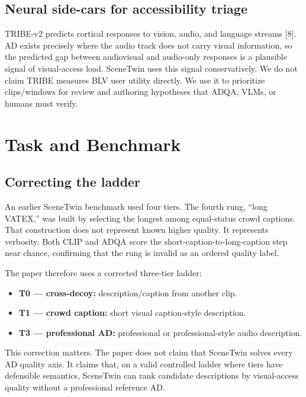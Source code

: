 \documentclass[10pt,twocolumn]{article}
\begin{document}
\subsection{Neural side-cars for accessibility triage}

TRIBE-v2 predicts cortical responses to vision, audio, and language streams [8]. AD exists precisely where the audio track does not carry visual information, so the predicted gap between audiovisual and audio-only responses is a plausible signal of visual-access load. SceneTwin uses this signal conservatively. We do not claim TRIBE measures BLV user utility directly. We use it to prioritize clips/windows for review and authoring hypotheses that ADQA, VLMs, or humans must verify.


\section{Task and Benchmark}


\subsection{Correcting the ladder}

An earlier SceneTwin benchmark used four tiers. The fourth rung, ``long VATEX,'' was built by selecting the longest among equal-status crowd captions. That construction does not represent known higher quality. It represents verbosity. Both CLIP and ADQA score the short-caption-to-long-caption step near chance, confirming that the rung is invalid as an ordered quality label.


The paper therefore uses a corrected three-tier ladder:


\begin{itemize}[leftmargin=*]
\item \textbf{T0 --- cross-decoy:} description/caption from another clip.
\item \textbf{T1 --- crowd caption:} short visual caption-style description.
\item \textbf{T3 --- professional AD:} professional or professional-style audio description.
\end{itemize}

This correction matters. The paper does not claim that SceneTwin solves every AD quality axis. It claims that, on a valid controlled ladder where tiers have defensible semantics, SceneTwin can rank candidate descriptions by visual-access quality without a professional reference AD.
\end{document}
